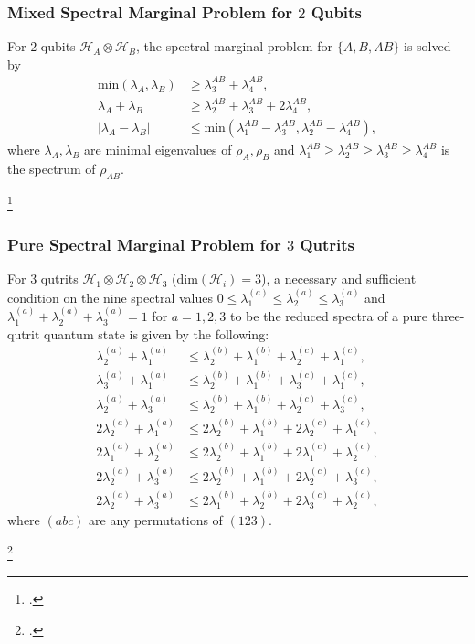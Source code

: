 \documentclass[
    9pt,
    hyperref={bookmarks=false, colorlinks=false}, %
    xcolor={dvipsnames},
]{beamer}
\begin{document}
\begin{frame}
    \frametitle{Mixed Spectral Marginal Problem for $2$ Qubits}
    \begin{theorem}
        For $2$ qubits $\mathcal H_A \otimes \mathcal H_B$, the spectral marginal problem for $\{ A, B, AB \}$ is solved by 
        \begin{align*}
            \mathrm{min}(\lambda_A, \lambda_B) &\geq \lambda_3^{AB} + \lambda_4^{AB}, \\
            \lambda_A + \lambda_B &\geq \lambda_2^{AB} + \lambda_3^{AB} + 2\lambda_4^{AB}, \\
            |\lambda_A - \lambda_B| &\leq \mathrm{min}(\lambda_1^{AB} - \lambda_3^{AB}, \lambda_2^{AB} - \lambda_4^{AB}),
        \end{align*}
        where $\lambda_A, \lambda_B$ are minimal eigenvalues of $\rho_A, \rho_B$ and $\lambda_1^{AB} \geq \lambda_{2}^{AB} \geq \lambda_{3}^{AB} \geq \lambda_{4}^{AB}$ is the spectrum of $\rho_{AB}$.
    \end{theorem}
    \footcitetext{bravyi2003requirements}
\end{frame}

\begin{frame}
    \frametitle{Pure Spectral Marginal Problem for $3$ Qutrits}
    \begin{theorem}
        For $3$ qutrits $\mathcal H_1 \otimes \mathcal H_2 \otimes \mathcal H_3$  ($\mathrm{dim}(\mathcal H_i) = 3$), a necessary and sufficient condition on the nine spectral values $0 \leq \lambda_1^{(a)} \leq \lambda_2^{(a)} \leq \lambda_3^{(a)}$ and $\lambda_1^{(a)} + \lambda_2^{(a)} + \lambda_3^{(a)} = 1$ for $a = 1,2,3$ to be the reduced spectra of a pure three-qutrit quantum state is given by the following:
        \begin{align*}
            \lambda_2^{(a)} + \lambda_1^{(a)} &\leq \lambda_2^{(b)} + \lambda_1^{(b)} + \lambda_2^{(c)} + \lambda_1^{(c)}, \\
            \lambda_3^{(a)} + \lambda_1^{(a)} &\leq \lambda_2^{(b)} + \lambda_1^{(b)} + \lambda_3^{(c)} + \lambda_1^{(c)}, \\
            \lambda_2^{(a)} + \lambda_3^{(a)} &\leq \lambda_2^{(b)} + \lambda_1^{(b)} + \lambda_2^{(c)} + \lambda_3^{(c)}, \\
            2\lambda_2^{(a)} + \lambda_1^{(a)} &\leq 2\lambda_2^{(b)} + \lambda_1^{(b)} + 2\lambda_2^{(c)} + \lambda_1^{(c)}, \\
            2\lambda_1^{(a)} + \lambda_2^{(a)} &\leq 2\lambda_2^{(b)} + \lambda_1^{(b)} + 2\lambda_1^{(c)} + \lambda_2^{(c)}, \\
            2\lambda_2^{(a)} + \lambda_3^{(a)} &\leq 2\lambda_2^{(b)} + \lambda_1^{(b)} + 2\lambda_2^{(c)} + \lambda_3^{(c)}, \\
            2\lambda_2^{(a)} + \lambda_3^{(a)} &\leq 2\lambda_1^{(b)} + \lambda_2^{(b)} + 2\lambda_3^{(c)} + \lambda_2^{(c)},
        \end{align*}
        where $(abc)$ are any permutations of $(123)$.
    \end{theorem}
    \footcitetext{higuchi2003qutrit}
\end{frame}
\end{document}
